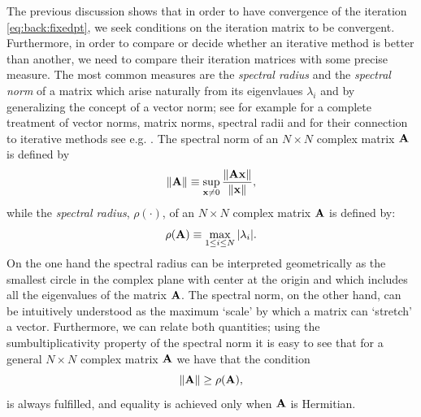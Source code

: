 The previous discussion shows that in order to have convergence of the iteration \eqref{eq:back:fixedpt}, we seek conditions on the iteration matrix to be convergent. Furthermore, in order to compare or decide whether an iterative method is better than another, we need to compare their iteration matrices with some precise measure. The most common measures are the \emph{spectral radius} and the \emph{spectral norm} of a matrix which arise naturally from its eigenvlaues $\lambda_i$ and by generalizing the concept of a vector norm; see for example \cite{HorJoh91} for a complete treatment of vector norms, matrix norms, spectral radii and for their connection to iterative methods see e.g. \cite{Ste01}. The spectral norm of an $N\times N$ complex matrix $\mathbf{A}$ is defined by
\begin{equation*}
\|\mathbf{A}\|\equiv\sup_{\mathbf{x}\neq 0}\frac{\|\mathbf{A}\mathbf{x}\|}{\|\mathbf{x}\|},
\end{equation*}
while the \emph{spectral radius}, $\rho(\cdot)$, of an $N\times N$ complex matrix $\mathbf{A}$ is defined by:
\begin{equation*}
\rho(\mathbf{A})\equiv\max_{1\leq i\leq N}|\lambda_i|.
\end{equation*}
On the one hand the spectral radius can be interpreted geometrically as the smallest circle in the complex plane with center at the origin and which includes all the eigenvalues of the matrix $\mathbf{A}$. The spectral norm, on the other hand, can be intuitively understood as the maximum `scale' by which a matrix can `stretch' a vector. Furthermore, we can relate both quantities; using the sumbultiplicativity property of the spectral norm it is easy to see that for a general $N\times N$ complex matrix $\mathbf{A}$ we have that the condition
\begin{equation*}
\|\mathbf{A}\|\geq \rho(\mathbf{A}),
\label{eq:back:norm_and_rad}
\end{equation*}
is always fulfilled, and equality is achieved only when $\mathbf{A}$ is Hermitian.

